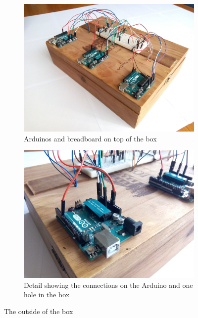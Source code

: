 \begin{figure}[h]
    \centering
    \begin{subfigure}[t]{0.49\textwidth}
        \centering
        \includegraphics[width=\textwidth]{img/setup_box_closed}
        \caption{Arduinos and breadboard on top of the box}
        \label{fig:setup_box_closed}
    \end{subfigure}
    \begin{subfigure}[t]{0.49\textwidth}
        \centering
        \includegraphics[width=\textwidth]{img/setup_arduino_connections.jpg}
        \caption{Detail showing the connections on the Arduino and one hole in the box}
        \label{fig:setup_arduino_connections}
    \end{subfigure}
    \caption{The outside of the box}
    \label{fig:setup_box_outside}
\end{figure}


